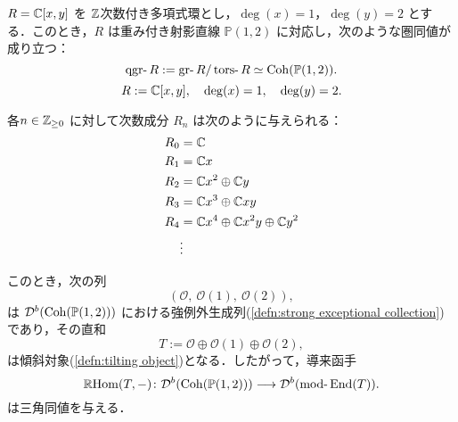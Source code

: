 \begin{exmp}
$R = {\mathbb C}[x, y]$ を ${\mathbb Z}$次数付き多項式環とし，$\deg(x) = 1$，$\deg(y) = 2$ とする．このとき，$R$ は重み付き射影直線 $\mathbb{P}(1,2)$ に対応し，次のような圏同値が成り立つ：
\[
\qgr R := \gr R / \tors R \simeq \Coh(\mathbb{P}(1,2)).
\]
\[
R := {\mathbb C}[x, y], \quad \deg(x) = 1,\quad \deg(y) = 2.
\]

各\(n \in {\mathbb Z}_{\ge 0}\) に対して次数成分 \(R_n\) は次のように与えられる：
\[
\begin{aligned}
R_0 &= {\mathbb C} \\
R_1 &= {\mathbb C} x \\
R_2 &= {\mathbb C} x^2 \oplus {\mathbb C} y \\
R_3 &= {\mathbb C} x^3 \oplus {\mathbb C} x y \\
R_4 &= {\mathbb C} x^4 \oplus {\mathbb C} x^2 y \oplus {\mathbb C} y^2 \\
&\vdots 
\end{aligned}
\]

このとき，次の列
\[
(\mathcal{O},\ \mathcal{O}(1),\ \mathcal{O}(2)),
\]
は \({\mathcal D}^b(\operatorname{\mathrm{Coh}}(\mathbb{P}(1,2)))\) における強例外生成列(\ref{defn:strong exceptional collection})であり，その直和
\[
T := \mathcal{O} \oplus \mathcal{O}(1) \oplus \mathcal{O}(2),
\]
は傾斜対象(\ref{defn:tilting object})となる．したがって，導来函手
\[
\RHom(T, -) \colon \D^b(\Coh(\mathbb{P}(1,2))) \longrightarrow \D^b(\mod \End(T)).
\]
は三角同値を与える．
\end{exmp}

